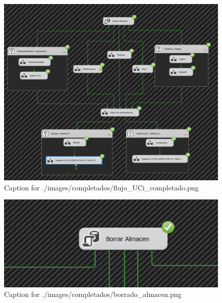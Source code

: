 \documentclass{article}
\begin{document}
\begin{figure}[H]
  \centering
  \includegraphics[width=\linewidth]{./images/completados/flujo_UCi_completado.png}
  \caption{Caption for ./images/completados/flujo_UCi_completado.png}
\end{figure}
\begin{figure}[H]
  \centering
  \includegraphics[width=\linewidth]{./images/completados/borrado_almacen.png}
  \caption{Caption for ./images/completados/borrado_almacen.png}
\end{figure}
\end{document}
